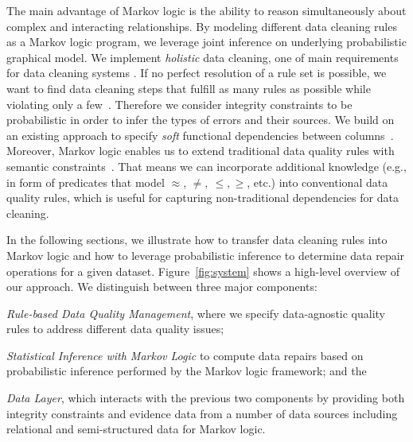 The main advantage of Markov logic is the ability to reason simultaneously about complex and interacting relationships. By modeling different data cleaning rules as a Markov logic program, we leverage joint inference on underlying probabilistic graphical model. We implement \textit{holistic} data cleaning, one of main requirements for data cleaning systems \cite{fan2013data, Fan:2014:IRM:2628135.2567657, Dallachiesa:2013:NCD:2463676.2465327}. If no perfect resolution of a rule set is possible, we want to find data cleaning steps that fulfill as many rules as possible while violating only a few~\cite{genesereth1987logical, domingos2009markov}. Therefore we consider integrity constraints to be probabilistic in order to infer the types of errors and their sources. We build on an existing approach to specify \textit{soft} functional dependencies between columns~\cite{Ilyas:2004:CAD:1007568.1007641}. Moreover, Markov logic enables us to extend traditional data quality rules with semantic constraints~\cite{spies2013knowledge}. That means we can incorporate additional knowledge (e.g., in form of predicates that model $\approx$, $\neq,~\leq,\geq$, etc.) into conventional data quality rules, which is useful for capturing non-traditional dependencies \cite{chen2009analyses} for data cleaning. 

In the following sections, we illustrate how to transfer data cleaning rules into Markov logic and how to leverage probabilistic inference to determine data repair operations for a given dataset. Figure~\ref{fig:system} shows a high-level overview of our approach. We distinguish between three major components: 
\begin{inparaenum}
\item \textit{Rule-based Data Quality Management}, where we specify data-agnostic quality rules to address different data quality issues;
\item \textit{Statistical Inference with Markov Logic} to compute data repairs based on probabilistic inference performed by the Markov logic framework; and the 
\item \textit{Data Layer}, which interacts with the previous two components by providing both integrity constraints and evidence data from a number of data sources including relational and semi-structured data for Markov logic.
\end{inparaenum}


